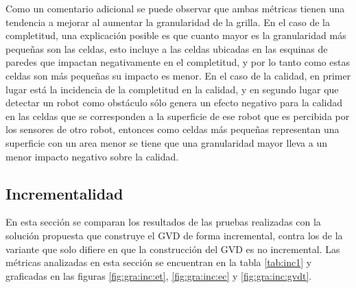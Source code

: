Como un comentario adicional se puede observar que ambas métricas tienen una
tendencia a mejorar al aumentar la granularidad de la grilla. En el caso de la
completitud, una explicación posible es que cuanto mayor es la granularidad
más pequeñas son las celdas, esto incluye a las celdas ubicadas en las esquinas de
paredes que impactan negativamente en el completitud, y por lo tanto como estas celdas son
más pequeñas su impacto es menor. En el caso de la
calidad, en primer lugar está la incidencia de la completitud en la calidad, y en
segundo lugar que detectar un robot como obstáculo sólo genera un efecto
negativo para la calidad en las celdas que se corresponden a la superficie
de ese robot que es percibida por los sensores de otro robot, entonces como
celdas más pequeñas representan una superficie con un area menor se tiene que una
granularidad mayor lleva a un menor impacto negativo sobre la calidad.




\subsection{Incrementalidad}\label{sec:exp:inc}
En esta sección se comparan los resultados de las pruebas realizadas con la
solución propuesta que construye el GVD de forma incremental, contra los de la 
variante que solo difiere en que la construcción del GVD es no incremental. Las
métricas analizadas en esta sección se encuentran en la tabla \ref{tab:inc1}
y graficadas en las figuras \ref{fig:gra:inc:et}, \ref{fig:gra:inc:ec} y
\ref{fig:gra:inc:gvdt}.



